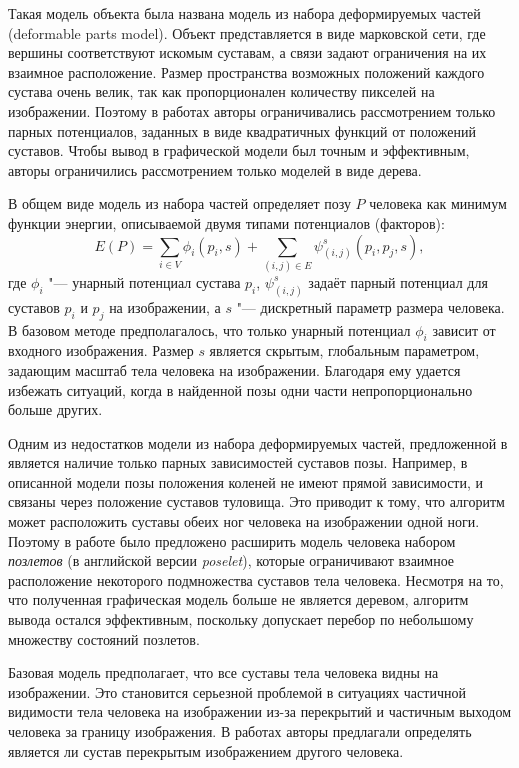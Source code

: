 Такая модель объекта была названа модель из набора деформируемых частей (deformable parts model). Объект представляется в виде марковской сети, где вершины соответствуют искомым суставам, а связи задают ограничения на их взаимное расположение. Размер пространства возможных положений каждого сустава очень велик, так как пропорционален количеству пикселей на изображении. Поэтому в работах \cite{yang2011articulated,pirsiavash2012steerable} авторы ограничивались рассмотрением только парных потенциалов, заданных в виде квадратичных функций от положений суставов. Чтобы вывод в графической модели был точным и эффективным, авторы ограничились рассмотрением только моделей в виде дерева.

В общем виде модель из набора частей определяет позу $P$ человека как минимум функции энергии, описываемой двумя типами потенциалов (факторов):
\begin{equation}
	E(P) = \sum_{i\in V}{\phi_i(p_i, s)} + \sum_{\left(i,j\right)\in E}{\psi_{(i,j)}^s(p_i, p_j, s)},
	\label{eq::rel::im_pose}
\end{equation} 
где $\phi_i$ "--- унарный потенциал сустава $p_i$, $\psi_{(i,j)}^s$ задаёт парный потенциал для суставов $p_i$ и $p_j$ на изображении, а $s$ "--- дискретный параметр размера человека. В базовом методе предполагалось, что только унарный потенциал $\phi_i$ зависит от входного изображения. Размер $s$ является скрытым, глобальным параметром, задающим масштаб тела человека на изображении. Благодаря ему удается избежать ситуаций, когда в найденной позы одни части непропорционально больше других.

Одним из недостатков модели из набора деформируемых частей, предложенной в \cite{yang2011articulated} является наличие только парных зависимостей суставов позы. Например,
в описанной модели позы положения коленей не имеют прямой зависимости, и связаны через положение суставов туловища. Это приводит к тому, что алгоритм может расположить суставы обеих ног человека на изображении одной ноги. Поэтому в работе \cite{pishchulin2013poselet} было предложено расширить модель человека набором \textit{позлетов} (в английской версии \textit{poselet}), которые ограничивают взаимное расположение некоторого подмножества суставов тела человека. Несмотря на то, что полученная графическая модель больше не является деревом, алгоритм вывода остался эффективным, поскольку допускает перебор по небольшому множеству состояний позлетов.

Базовая модель предполагает, что все суставы тела человека видны на изображении. Это становится серьезной проблемой в ситуациях частичной видимости тела человека на изображении из-за перекрытий и частичным выходом человека за границу изображения. В работах \cite{ghiasi2014parsing,chen2015parsing} авторы предлагали определять является ли сустав перекрытым изображением другого человека.

